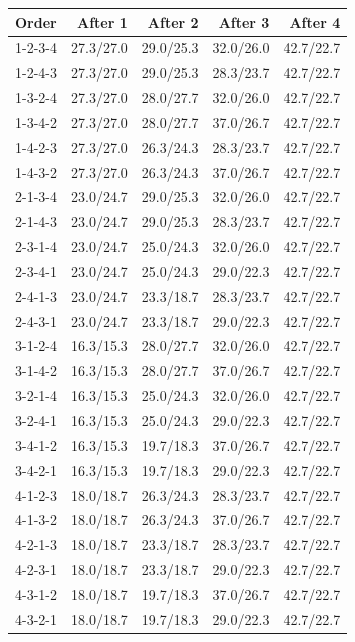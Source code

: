 \begin{tabular}{lrrrr}
\toprule
Order & After 1 & After 2 & After 3 & After 4 \\
\midrule
1-2-3-4 & 27.3/27.0 & 29.0/25.3 & 32.0/26.0 & 42.7/22.7 \\
1-2-4-3 & 27.3/27.0 & 29.0/25.3 & 28.3/23.7 & 42.7/22.7 \\
1-3-2-4 & 27.3/27.0 & 28.0/27.7 & 32.0/26.0 & 42.7/22.7 \\
1-3-4-2 & 27.3/27.0 & 28.0/27.7 & 37.0/26.7 & 42.7/22.7 \\
1-4-2-3 & 27.3/27.0 & 26.3/24.3 & 28.3/23.7 & 42.7/22.7 \\
1-4-3-2 & 27.3/27.0 & 26.3/24.3 & 37.0/26.7 & 42.7/22.7 \\
2-1-3-4 & 23.0/24.7 & 29.0/25.3 & 32.0/26.0 & 42.7/22.7 \\
2-1-4-3 & 23.0/24.7 & 29.0/25.3 & 28.3/23.7 & 42.7/22.7 \\
2-3-1-4 & 23.0/24.7 & 25.0/24.3 & 32.0/26.0 & 42.7/22.7 \\
2-3-4-1 & 23.0/24.7 & 25.0/24.3 & 29.0/22.3 & 42.7/22.7 \\
2-4-1-3 & 23.0/24.7 & 23.3/18.7 & 28.3/23.7 & 42.7/22.7 \\
2-4-3-1 & 23.0/24.7 & 23.3/18.7 & 29.0/22.3 & 42.7/22.7 \\
3-1-2-4 & 16.3/15.3 & 28.0/27.7 & 32.0/26.0 & 42.7/22.7 \\
3-1-4-2 & 16.3/15.3 & 28.0/27.7 & 37.0/26.7 & 42.7/22.7 \\
3-2-1-4 & 16.3/15.3 & 25.0/24.3 & 32.0/26.0 & 42.7/22.7 \\
3-2-4-1 & 16.3/15.3 & 25.0/24.3 & 29.0/22.3 & 42.7/22.7 \\
3-4-1-2 & 16.3/15.3 & 19.7/18.3 & 37.0/26.7 & 42.7/22.7 \\
3-4-2-1 & 16.3/15.3 & 19.7/18.3 & 29.0/22.3 & 42.7/22.7 \\
4-1-2-3 & 18.0/18.7 & 26.3/24.3 & 28.3/23.7 & 42.7/22.7 \\
4-1-3-2 & 18.0/18.7 & 26.3/24.3 & 37.0/26.7 & 42.7/22.7 \\
4-2-1-3 & 18.0/18.7 & 23.3/18.7 & 28.3/23.7 & 42.7/22.7 \\
4-2-3-1 & 18.0/18.7 & 23.3/18.7 & 29.0/22.3 & 42.7/22.7 \\
4-3-1-2 & 18.0/18.7 & 19.7/18.3 & 37.0/26.7 & 42.7/22.7 \\
4-3-2-1 & 18.0/18.7 & 19.7/18.3 & 29.0/22.3 & 42.7/22.7 \\
\bottomrule
\end{tabular}
